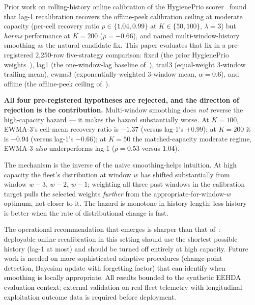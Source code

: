 Prior work on rolling-history online calibration of the HygienePrio
scorer~\cite{paper7online} found that lag-1 recalibration recovers the
offline-peek calibration ceiling at moderate capacity (per-cell
recovery ratio $\rho \in \{1.04, 0.99\}$ at $K \in \{50, 100\}$,
$\lambda = 3$) but \textit{harms} performance at $K = 200$
($\rho = -0.66$), and named multi-window-history smoothing as the
natural candidate fix. This paper evaluates that fix in a
pre-registered 2{,}250-row five-strategy comparison: \textsf{fixed}
(the prior HygienePrio weights~\cite{paper4hygieneprio}), \textsf{lag1}
(the one-window-lag baseline of~\cite{paper7online}), \textsf{trail3}
(equal-weight 3-window trailing mean), \textsf{ewma3}
(exponentially-weighted 3-window mean, $\alpha = 0.6$), and
\textsf{offline} (the offline-peek ceiling of~\cite{paper7online}).

\textbf{All four pre-registered hypotheses are rejected, and the
direction of rejection is the contribution.} Multi-window smoothing
does \textit{not} reverse the high-capacity hazard --- it makes the
hazard substantially worse. At $K = 100$, EWMA-3's cell-mean recovery
ratio is $-1.37$ (versus lag-1's $+0.99$); at $K = 200$ it is $-0.94$
(versus lag-1's $-0.66$); at $K = 50$ the matched-capacity moderate
regime, EWMA-3 \textit{also} underperforms lag-1 ($\rho = 0.53$
versus $1.04$).

The mechanism is the inverse of the naive smoothing-helps intuition.
At high capacity the fleet's distribution at window $w$ has shifted
substantially from window $w - 3$, $w - 2$, $w - 1$; weighting all
three past windows in the calibration target pulls the selected
weights \textit{further} from the appropriate-for-window-$w$ optimum,
not closer to it. The hazard is monotone in history length: less
history is better when the rate of distributional change is fast.

The operational recommendation that emerges is sharper than that of~\cite{paper7online}:
deployable online recalibration in this setting should use the
shortest possible history (lag-1 at most) and should be turned off
entirely at high capacity. Future work is needed on more sophisticated
adaptive procedures (change-point detection, Bayesian update with
forgetting factor) that can identify when smoothing is locally
appropriate. All results bounded to the synthetic EEHDA evaluation
context; external validation on real fleet telemetry with longitudinal
exploitation outcome data is required before deployment.
